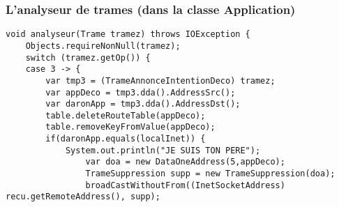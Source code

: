 \documentclass[a4paper,titlepage]{report}
\begin{document}
\subsubsection{L'analyseur de trames (dans la classe Application)}
\begin{lstlisting}
void analyseur(Trame tramez) throws IOException {
	Objects.requireNonNull(tramez);
	switch (tramez.getOp()) {
	case 3 -> {
		var tmp3 = (TrameAnnonceIntentionDeco) tramez;
		var appDeco = tmp3.dda().AddressSrc();
		var daronApp = tmp3.dda().AddressDst();
		table.deleteRouteTable(appDeco);
		table.removeKeyFromValue(appDeco);
		if(daronApp.equals(localInet)) {
			System.out.println("JE SUIS TON PERE");
				var doa = new DataOneAddress(5,appDeco);
				TrameSuppression supp = new TrameSuppression(doa);
				broadCastWithoutFrom((InetSocketAddress) recu.getRemoteAddress(), supp);
				

\end{lstlisting}
\end{document}
